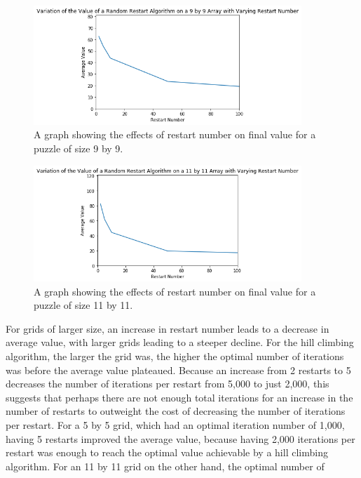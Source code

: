 \documentclass[12pt]{article}
\begin{document}
\begin{figure}[H]
    \centering
    \includegraphics[width=0.9\textwidth]{random_restarts_9x9_restarts}
    \caption{A graph showing the effects of restart number on final value for a puzzle of size 9 by 9.}
    \label{fig:random_restarts_9x9_restarts}
\end{figure}

\begin{figure}[H]
    \centering
    \includegraphics[width=0.9\textwidth]{random_restarts_11x11_restarts}
    \caption{A graph showing the effects of restart number on final value for a puzzle of size 11 by 11.}
    \label{fig:random_restarts_11x11_restarts}
\end{figure}

For grids of larger size, an increase in restart number leads to a decrease in average value, with larger grids leading to a steeper decline. For the hill climbing algorithm, the larger the grid was, the higher the optimal number of iterations was before the average value plateaued. Because an increase from 2 restarts to 5 decreases the number of iterations per restart from 5,000 to just 2,000, this suggests that perhaps there are not enough total iterations for an increase in the number of restarts to outweight the cost of decreasing the number of iterations per restart. For a 5 by 5 grid, which had an optimal iteration number of 1,000, having 5 restarts improved the average value, because having 2,000 iterations per restart was enough to reach the optimal value achievable by a hill climbing algorithm. For an 11 by 11 grid on the other hand, the optimal number of 
\end{document}
